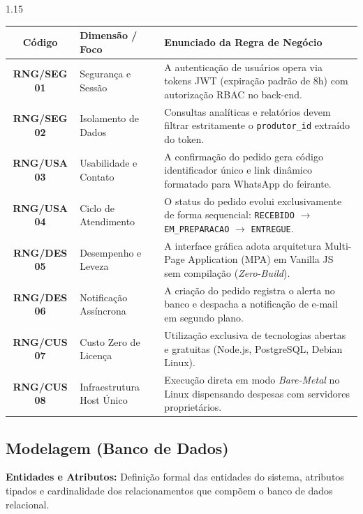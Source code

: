 \documentclass[12pt,a4paper]{article}
\begin{document}
\noindent
\begin{spacing}{1.15}
\begin{tabularx}{\textwidth}{|c|p{4.0cm}|X|}
\hline
\textbf{Código} & \textbf{Dimensão / Foco} & \textbf{Enunciado da Regra de Negócio} \\ \hline
\textbf{RNG/SEG 01} & Segurança e Sessão & A autenticação de usuários opera via tokens JWT (expiração padrão de 8h) com autorização RBAC no back-end. \\ \hline
\textbf{RNG/SEG 02} & Isolamento de Dados & Consultas analíticas e relatórios devem filtrar estritamente o \texttt{produtor\_id} extraído do token. \\ \hline
\textbf{RNG/USA 03} & Usabilidade e Contato & A confirmação do pedido gera código identificador único e link dinâmico formatado para WhatsApp do feirante. \\ \hline
\textbf{RNG/USA 04} & Ciclo de Atendimento & O status do pedido evolui exclusivamente de forma sequencial: \texttt{RECEBIDO} $\rightarrow$ \texttt{EM\_PREPARACAO} $\rightarrow$ \texttt{ENTREGUE}. \\ \hline
\textbf{RNG/DES 05} & Desempenho e Leveza & A interface gráfica adota arquitetura Multi-Page Application (MPA) em Vanilla JS sem compilação (\textit{Zero-Build}). \\ \hline
\textbf{RNG/DES 06} & Notificação Assíncrona & A criação do pedido registra o alerta no banco e despacha a notificação de e-mail em segundo plano. \\ \hline
\textbf{RNG/CUS 07} & Custo Zero de Licença & Utilização exclusiva de tecnologias abertas e gratuitas (Node.js, PostgreSQL, Debian Linux). \\ \hline
\textbf{RNG/CUS 08} & Infraestrutura Host Único & Execução direta em modo \textit{Bare-Metal} no Linux dispensando despesas com servidores proprietários. \\ \hline
\end{tabularx}
\end{spacing}

\newpage

\subsection{Modelagem (Banco de Dados)}

\noindent \textbf{Entidades e Atributos:} Definição formal das entidades do sistema, atributos tipados e cardinalidade dos relacionamentos que compõem o banco de dados relacional.
\end{document}
